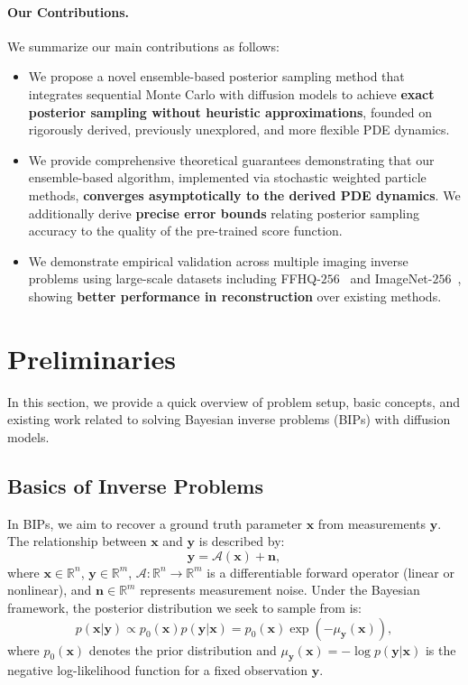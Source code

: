 \documentclass{article}
\numberwithin{equation}{section}
\def\vn{{\bm{n}}}
\def\vx{{\bm{x}}}
\def\vy{{\bm{y}}}
\def\gA{{\mathcal{A}}}
\begin{document}
\paragraph{Our Contributions.} 

We summarize our main contributions as follows:
\begin{itemize}[leftmargin=1.5em, itemsep=0pt, topsep=0pt]
    \item We propose a novel ensemble-based posterior sampling method that integrates sequential Monte Carlo with diffusion models to achieve \textbf{exact posterior sampling without heuristic approximations}, founded on rigorously derived, previously unexplored, and more flexible PDE dynamics.
    \item We provide comprehensive theoretical guarantees demonstrating that our ensemble-based algorithm, implemented via stochastic weighted particle methods, \textbf{converges asymptotically to the derived PDE dynamics}. We additionally derive \textbf{precise error bounds} relating posterior sampling accuracy to the quality of the pre-trained score function.
    \item We demonstrate empirical validation across multiple imaging inverse problems using large-scale datasets including FFHQ-$256$~\cite{karras2019style} and ImageNet-$256$~\cite{deng2009imagenet}, showing \textbf{better performance in reconstruction} over existing methods.
\end{itemize}


\section{Preliminaries}
\label{sec: preliminaries}

In this section, we provide a quick overview of problem setup, basic concepts, and existing work related to solving Bayesian inverse problems (BIPs) with diffusion models. 

\subsection{Basics of Inverse Problems}
\label{subsec: Basics of Inverse Problems}

In BIPs, we aim to recover a ground truth parameter $\vx$ from measurements $\vy$. The relationship between $\vx$ and $\vy$ is described by:
\begin{equation}
\label{eqn: BIP setup}
\vy = \gA(\vx) + \vn,    
\end{equation}
where $\vx \in \mathbb{R}^n$, $\vy \in \mathbb{R}^m$, $\gA:\mathbb{R}^{n} \rightarrow \mathbb{R}^m$ is a differentiable forward operator (linear or nonlinear), and $\vn \in \mathbb{R}^m$ represents measurement noise. Under the Bayesian framework, the posterior distribution we seek to sample from is:
\begin{equation}
\label{eqn: Bayes formula}
p(\vx | \vy) \propto p_0(\vx) p(\vy | \vx) = p_0(\vx)\exp(-\mu_{\vy}(\vx)),    
\end{equation}
where $p_0(\vx)$ denotes the prior distribution and $\mu_{\vy}(\vx) = -\log p(\vy | \vx)$ is the negative log-likelihood function for a fixed observation $\vy$.
\end{document}
